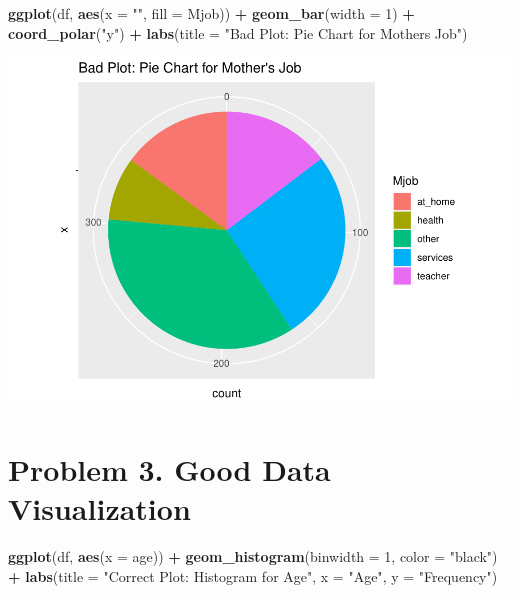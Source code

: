 \documentclass[
  11pt,
]{article}
\newenvironment{Shaded}{\begin{snugshade}}{\end{snugshade}}
\newcommand{\AttributeTok}[1]{\textcolor[rgb]{0.13,0.29,0.53}{#1}}
\newcommand{\DecValTok}[1]{\textcolor[rgb]{0.00,0.00,0.81}{#1}}
\newcommand{\FunctionTok}[1]{\textcolor[rgb]{0.13,0.29,0.53}{\textbf{#1}}}
\newcommand{\NormalTok}[1]{#1}
\newcommand{\SpecialCharTok}[1]{\textcolor[rgb]{0.81,0.36,0.00}{\textbf{#1}}}
\newcommand{\StringTok}[1]{\textcolor[rgb]{0.31,0.60,0.02}{#1}}
\begin{document}
\begin{Shaded}
\begin{Highlighting}[]
\FunctionTok{ggplot}\NormalTok{(df, }\FunctionTok{aes}\NormalTok{(}\AttributeTok{x =} \StringTok{""}\NormalTok{, }\AttributeTok{fill =}\NormalTok{ Mjob)) }\SpecialCharTok{+}
  \FunctionTok{geom\_bar}\NormalTok{(}\AttributeTok{width =} \DecValTok{1}\NormalTok{) }\SpecialCharTok{+}
  \FunctionTok{coord\_polar}\NormalTok{(}\StringTok{"y"}\NormalTok{) }\SpecialCharTok{+}
  \FunctionTok{labs}\NormalTok{(}\AttributeTok{title =} \StringTok{"Bad Plot: Pie Chart for Mother\textquotesingle{}s Job"}\NormalTok{)}
\end{Highlighting}
\end{Shaded}

\includegraphics{figs/unnamed-chunk-5.pdf}

\section{Problem 3. Good Data
Visualization}\label{problem-3.-good-data-visualization}

\begin{Shaded}
\begin{Highlighting}[]
\FunctionTok{ggplot}\NormalTok{(df, }\FunctionTok{aes}\NormalTok{(}\AttributeTok{x =}\NormalTok{ age)) }\SpecialCharTok{+}
  \FunctionTok{geom\_histogram}\NormalTok{(}\AttributeTok{binwidth =} \DecValTok{1}\NormalTok{, }\AttributeTok{color =} \StringTok{"black"}\NormalTok{) }\SpecialCharTok{+}
  \FunctionTok{labs}\NormalTok{(}\AttributeTok{title =} \StringTok{"Correct Plot: Histogram for Age"}\NormalTok{, }\AttributeTok{x =} \StringTok{"Age"}\NormalTok{, }\AttributeTok{y =} \StringTok{"Frequency"}\NormalTok{)}
\end{Highlighting}
\end{Shaded}
\end{document}
